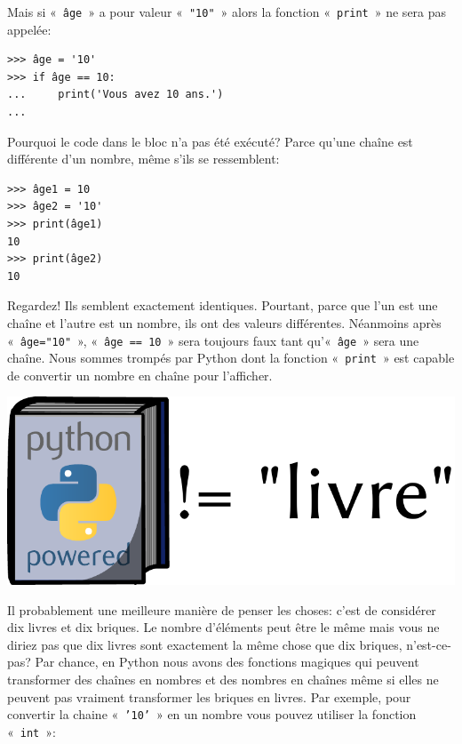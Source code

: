 Mais si «~\texttt{âge}~»  a pour valeur «~\texttt{"10"}~» alors la fonction «~\texttt{print}~» ne sera pas appelée:

\begin{Verbatim}[frame=single,rulecolor=\color{green}, label=à taper avec attention]
>>> âge = '10'
>>> if âge == 10:
...     print('Vous avez 10 ans.')
...
\end{Verbatim}

Pourquoi le code dans le bloc n'a pas été exécuté? Parce qu'une chaîne est différente d'un nombre, même s'ils se ressemblent:

\begin{Verbatim}[frame=single,rulecolor=\color{mbleu}, label=à taper]
>>> âge1 = 10
>>> âge2 = '10'
>>> print(âge1)
10
>>> print(âge2)
10
\end{Verbatim}

Regardez! Ils semblent exactement identiques. Pourtant, parce que l'un est une chaîne et l'autre est un nombre, ils ont des valeurs différentes. Néanmoins après «~\texttt{âge="10"}~», «~\texttt{âge == 10}~»  sera toujours faux tant qu'«~\texttt{âge}~» sera une chaîne.  Nous sommes trompés par Python dont la fonction «~\texttt{print}~» est capable de convertir un nombre en chaîne pour l'afficher.

\begin{center}
\includegraphics[scale=1]{images/livre.pdf} 
\end{center}

Il probablement une meilleure manière de penser les choses: c'est de considérer dix livres et dix briques. Le nombre d'éléments peut être le même mais vous ne diriez pas que dix livres sont exactement la même chose que dix briques, n'est-ce-pas? Par chance, en Python nous avons des fonctions magiques qui peuvent transformer des chaînes en nombres et des nombres en chaînes même si elles ne peuvent pas vraiment transformer les briques en livres. Par exemple, pour convertir la chaine «~\texttt{'10'}~»  en un nombre vous pouvez utiliser la fonction «~\texttt{int}~»: 

